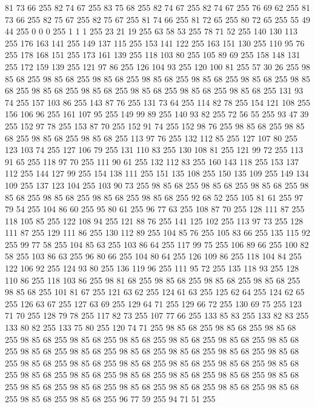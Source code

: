 81 73 66 255 82 74 67 255 83 75 68 255 82 74 67 255 82 74 67 255 76 69 62 255 81 73 66 255 82 75 67 255 82 75 67 255 81 74 66 255 81 72 65 255 80 72 65 255 55 49 44 255 0 0 0 255 1 1 1 255 23 21 19 255 63 58 53 255 78 71 52 255 140 130 113 255 176 163 141 255 149 137 115 255 153 141 122 255 163 151 130 255 110 95 76 255 178 168 151 255 173 161 139 255 118 103 80 255 105 89 69 255 158 148 131 255 172 159 139 255 121 97 86 255 126 104 93 255 120 100 81 255 57 30 26 255 98 85 68 255 98 85 68 255 98 85 68 255 98 85 68 255 98 85 68 255 98 85 68 255 98 85 68 255 98 85 68 255 98 85 68 255 98 85 68 255 98 85 68 255 98 85 68 255 131 93 74 255 157 103 86 255 143 87 76 255 131 73 64 255 114 82 78 255 154 121 108 255 156 106 96 255 161 107 95 255 149 99 89 255 140 93 82 255 72 56 55 255 93 47 39 255 152 97 78 255 153 87 70 255 152 91 74 255 152 98 76 255 98 85 68 255 98 85 68 255
98 85 68 255 98 85 68 255 113 97 76 255 132 112 85 255 127 107 80 255 123 103 74 255 127 106 79 255 131 110 83 255 130 108 81 255 121 99 72 255 113 91 65 255 118 97 70 255 111 90 61 255 132 112 83 255 160 143 118 255 153 137 112 255 144 127 99 255 154 138 111 255 151 135 108 255 150 135 109 255 149 134 109 255 137 123 104 255 103 90 73 255 98 85 68 255 98 85 68 255 98 85 68 255 98 85 68 255 98 85 68 255 98 85 68 255 98 85 68 255 92 68 52 255 105 81 61 255 97 79 54 255 104 86 60 255 95 80 61 255 96 77 63 255 108 87 70 255 128 111 87 255 118 105 85 255 122 108 94 255 121 88 76 255 141 125 102 255 113 97 73 255 128 111 87 255 129 111 86 255 130 112 89 255 104 85 76 255 105 83 66 255 135 115 92 255 99 77 58 255 104 85 63 255 103 86 64 255 117 99 75 255 106 89 66 255 100 82 58 255 103 86 63 255 96 80 66 255 104 80 64 255 126 109 86 255 118 104 84 255 122 106 92 255 124 93 80 255 136 119 96 255 111 95 72 255
135 118 93 255 128 110 86 255 118 103 86 255 98 81 68 255 98 85 68 255 98 85 68 255 98 85 68 255 98 85 68 255 101 81 67 255 121 63 62 255 124 61 63 255 125 62 64 255 124 62 65 255 126 63 67 255 127 63 69 255 129 64 71 255 129 66 72 255 130 69 75 255 123 71 70 255 128 79 78 255 117 82 73 255 107 77 66 255 133 85 83 255 133 82 83 255 133 80 82 255 133 75 80 255 120 74 71 255 98 85 68 255 98 85 68 255 98 85 68 255 98 85 68 255 98 85 68 255 98 85 68 255 98 85 68 255 98 85 68 255 98 85 68 255 98 85 68 255 98 85 68 255 98 85 68 255 98 85 68 255 98 85 68 255 98 85 68 255 98 85 68 255 98 85 68 255 98 85 68 255 98 85 68 255 98 85 68 255 98 85 68 255 98 85 68 255 98 85 68 255 98 85 68 255 98 85 68 255 98 85 68 255 98 85 68 255 98 85 68 255 98 85 68 255 98 85 68 255 98 85 68 255 98 85 68 255 98 85 68 255 98 85 68 255 98 85 68 255 96 77 59 255 94 71 51 255
